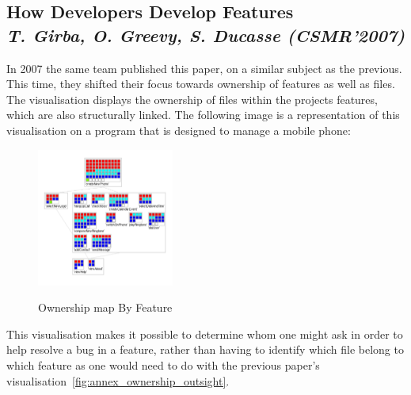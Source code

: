 \subsection{How Developers Develop Features\\ \textit{T. Girba, O. Greevy, S. Ducasse (CSMR'2007)}}

In 2007 the same team published this paper\cite{Girba2007}, on a similar subject as the previous. This time, they shifted their focus towards ownership of features as well as files. The visualisation displays the ownership of files within the projects features, which are also structurally linked. The following image is a representation of this visualisation on a program that is designed to manage a mobile phone:

\begin{figure}[H]
\centering
\includegraphics[width=0.4\textwidth]{./resources/girba2007.png}~
\caption{Ownership map By Feature}
\label{fig:ownership_map_by_feature}
\end{figure}

This visualisation makes it possible to determine whom one might ask in order to help resolve a bug in a feature, rather than having to identify which file belong to which feature as one would need to do with the previous paper's visualisation~\ref{fig:annex_ownership_outsight}.